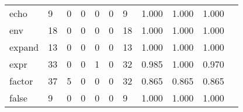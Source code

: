 \begin{longtable}{lp{1.20cm}p{1.20cm}p{1.20cm}p{1.20cm}p{1.20cm}p{1.20cm}p{1.20cm}p{1.20cm}p{1.20cm}p{1.20cm}}
echo      &                                     9 &                                                  0 &                                                  0 &                                                  0 &                                                  0 &                                                  9 &                                         1.000 &                                              1.000 &                                              1.000 \\
env       &                                    18 &                                                  0 &                                                  0 &                                                  0 &                                                  0 &                                                 18 &                                         1.000 &                                              1.000 &                                              1.000 \\
expand    &                                    13 &                                                  0 &                                                  0 &                                                  0 &                                                  0 &                                                 13 &                                         1.000 &                                              1.000 &                                              1.000 \\
expr      &                                    33 &                                                  0 &                                                  0 &                                                  1 &                                                  0 &                                                 32 &                                         0.985 &                                              1.000 &                                              0.970 \\
factor    &                                    37 &                                                  5 &                                                  0 &                                                  0 &                                                  0 &                                                 32 &                                         0.865 &                                              0.865 &                                              0.865 \\
false     &                                     9 &                                                  0 &                                                  0 &                                                  0 &                                                  0 &                                                  9 &                                         1.000 &                                              1.000 &                                              1.000 \\

\end{longtable}
